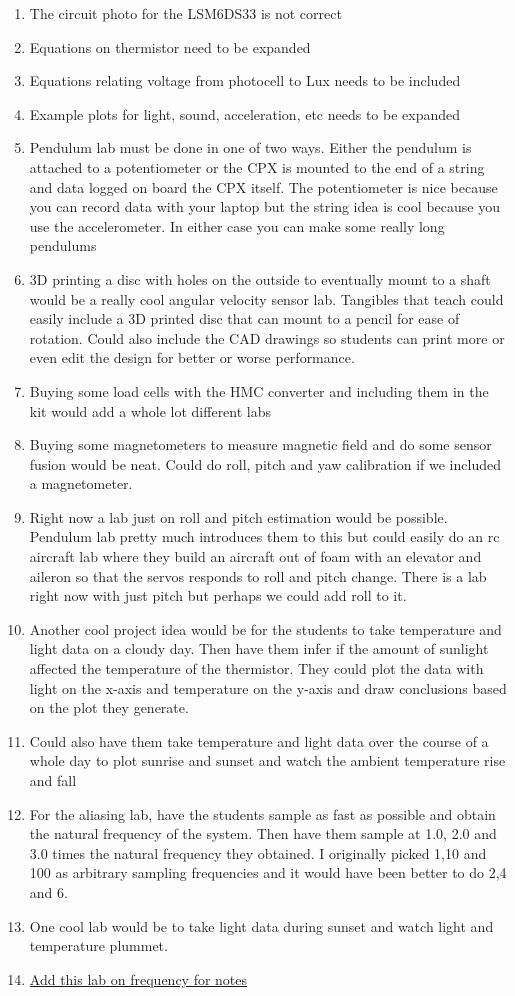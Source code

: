 \begin{enumerate}[itemsep=-5pt]
\item The circuit photo for the LSM6DS33 is not correct
\item Equations on thermistor need to be expanded
\item Equations relating voltage from photocell to Lux needs to be included
\item Example plots for light, sound, acceleration, etc needs to be expanded
\item Pendulum lab must be done in one of two ways. Either the pendulum is attached to a potentiometer or the CPX is mounted to the end of a string and data logged on board the CPX itself. The potentiometer is nice because you can record data with your laptop but the string idea is cool because you use the accelerometer. In either case you can make some really long pendulums
\item 3D printing a disc with holes on the outside to eventually mount to a shaft would be a really cool angular velocity sensor lab. Tangibles that teach could easily include a 3D printed disc that can mount to a pencil for ease of rotation. Could also include the CAD drawings so students can print more or even edit the design for better or worse performance.
\item Buying some load cells with the HMC converter and including them in the kit would add a whole lot different labs
\item Buying some magnetometers to measure magnetic field and do some sensor fusion would be neat. Could do roll, pitch and yaw calibration if we included a magnetometer.
\item Right now a lab just on roll and pitch estimation would be possible. Pendulum lab pretty much introduces them to this but could easily do an rc aircraft lab where they build an aircraft out of foam with an elevator and aileron so that the servos responds to roll and pitch change. There is a lab right now with just pitch but perhaps we could add roll to it.
\item Another cool project idea would be for the students to take temperature and light data on a cloudy day. Then have them infer if the amount of sunlight affected the temperature of the thermistor. They could plot the data with light on the x-axis and temperature on the y-axis and draw conclusions based on the plot they generate.
\item Could also have them take temperature and light data over the course of a whole day to plot sunrise and sunset and watch the ambient temperature rise and fall
\item For the aliasing lab, have the students sample as fast as possible and obtain the natural frequency of the system. Then have them sample at 1.0, 2.0 and 3.0 times the natural frequency they obtained. I originally picked 1,10 and 100 as arbitrary sampling frequencies and it would have been better to do 2,4 and 6.
\item One cool lab would be to take light data during sunset and watch light and temperature plummet.
\item \href{https://learn.adafruit.com/circuit-playground-o-phonor/musical-note-basics}{Add this lab on frequency for notes}
\end{enumerate}
